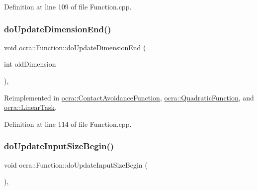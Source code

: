 Definition at line 109 of file Function.\+cpp.

\hypertarget{classocra_1_1Function_a17aa280f0e6eff4a7569edc373a5147d}{}\label{classocra_1_1Function_a17aa280f0e6eff4a7569edc373a5147d} 
\subsubsection{\texorpdfstring{do\+Update\+Dimension\+End()}{doUpdateDimensionEnd()}}
{\footnotesize\ttfamily void ocra\+::\+Function\+::do\+Update\+Dimension\+End (\begin{DoxyParamCaption}\item[{int}]{old\+Dimension }\end{DoxyParamCaption})\hspace{0.3cm}{\ttfamily [protected]}, {\ttfamily [virtual]}}



Reimplemented in \hyperlink{classocra_1_1ContactAvoidanceFunction_ad81a7b03b0fb7e8b2a037bccf5faea84}{ocra\+::\+Contact\+Avoidance\+Function}, \hyperlink{classocra_1_1QuadraticFunction_ad9b92a56e1c91c33630a5ba3f118c7b9}{ocra\+::\+Quadratic\+Function}, and \hyperlink{classocra_1_1LinearTask_aab97e5a858909e724ae8426f141c319b}{ocra\+::\+Linear\+Task}.



Definition at line 114 of file Function.\+cpp.

\hypertarget{classocra_1_1Function_a3f728f3758e6448aa59932853db5ddcc}{}\label{classocra_1_1Function_a3f728f3758e6448aa59932853db5ddcc} 
\subsubsection{\texorpdfstring{do\+Update\+Input\+Size\+Begin()}{doUpdateInputSizeBegin()}}
{\footnotesize\ttfamily void ocra\+::\+Function\+::do\+Update\+Input\+Size\+Begin (\begin{DoxyParamCaption}{ }\end{DoxyParamCaption})\hspace{0.3cm}{\ttfamily [protected]}, {\ttfamily [virtual]}}

